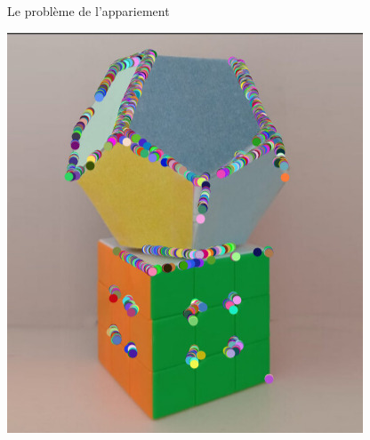 \begin{frame}{Le problème de l'appariement}
\begin{minipage}{0.48\linewidth}
    \includegraphics[width=\linewidth]{capture/test_detection_1_moravec_2_500.jpeg}
  \end{minipage}
\end{frame}

